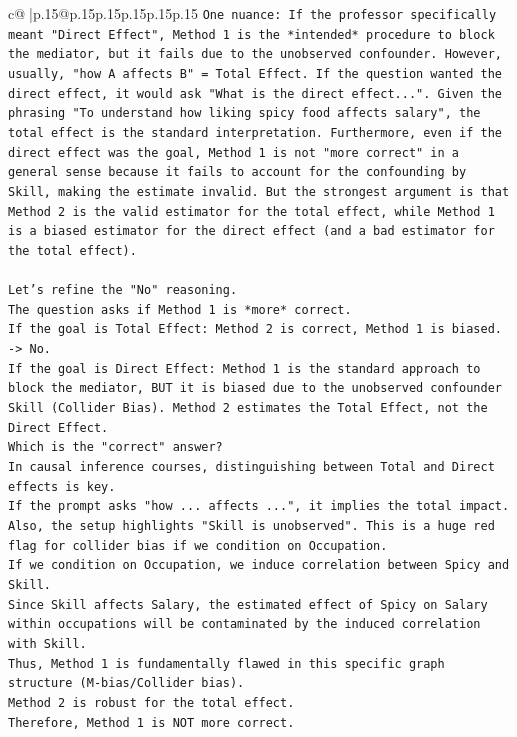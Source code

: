 \documentclass{article}
\begin{document}
{\begin{supertabular}{c@{$\;$}|p{.15\linewidth}@{}p{.15\linewidth}p{.15\linewidth}p{.15\linewidth}p{.15\linewidth}p{.15\linewidth}}
{{{\texttt{One nuance: If the professor specifically meant "Direct Effect", Method 1 is the *intended* procedure to block the mediator, but it fails due to the unobserved confounder. However, usually, "how A affects B" = Total Effect. If the question wanted the direct effect, it would ask "What is the direct effect...". Given the phrasing "To understand how liking spicy food affects salary", the total effect is the standard interpretation. Furthermore, even if the direct effect was the goal, Method 1 is not "more correct" in a general sense because it fails to account for the confounding by Skill, making the estimate invalid. But the strongest argument is that Method 2 is the valid estimator for the total effect, while Method 1 is a biased estimator for the direct effect (and a bad estimator for the total effect).} \\
\\ 
\texttt{Let's refine the "No" reasoning.} \\
\texttt{The question asks if Method 1 is *more* correct.} \\
\texttt{If the goal is Total Effect: Method 2 is correct, Method 1 is biased. {-}> No.} \\
\texttt{If the goal is Direct Effect: Method 1 is the standard approach to block the mediator, BUT it is biased due to the unobserved confounder Skill (Collider Bias). Method 2 estimates the Total Effect, not the Direct Effect.} \\
\texttt{Which is the "correct" answer?} \\
\texttt{In causal inference courses, distinguishing between Total and Direct effects is key.} \\
\texttt{If the prompt asks "how ... affects ...", it implies the total impact.} \\
\texttt{Also, the setup highlights "Skill is unobserved". This is a huge red flag for collider bias if we condition on Occupation.} \\
\texttt{If we condition on Occupation, we induce correlation between Spicy and Skill.} \\
\texttt{Since Skill affects Salary, the estimated effect of Spicy on Salary within occupations will be contaminated by the induced correlation with Skill.} \\
\texttt{Thus, Method 1 is fundamentally flawed in this specific graph structure (M{-}bias/Collider bias).} \\
\texttt{Method 2 is robust for the total effect.} \\
\texttt{Therefore, Method 1 is NOT more correct.} \\
}}}
\end{supertabular}}
\end{document}
